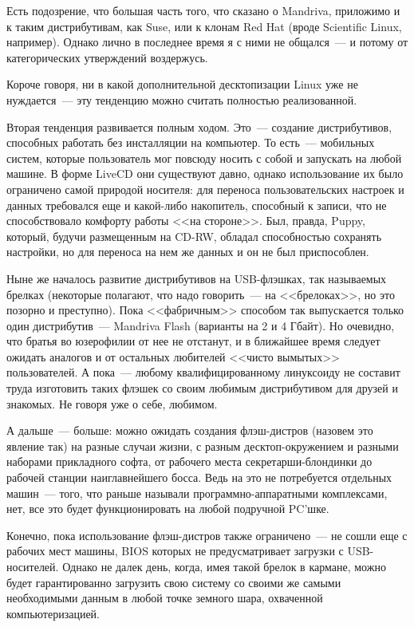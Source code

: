 Есть подозрение, что большая часть того, что сказано о Mandriva, приложимо и к таким дистрибутивам, как Suse, или к клонам Red Hat (вроде Scientific Linux, например). Однако лично в последнее время я с ними не общался~--- и потому от категорических утверждений воздержусь.

Короче говоря, ни в какой дополнительной десктопизации Linux уже не нуждается~--- эту тенденцию можно считать полностью реализованной.

Вторая тенденция развивается полным ходом. Это~--- создание дистрибутивов, способных работать без инсталляции на компьютер. То есть~--- мобильных систем, которые пользователь мог повсюду носить с собой и запускать на любой машине. В форме LiveCD они существуют давно, однако использование их было ограничено самой природой носителя: для переноса пользовательских настроек и данных требовался еще и какой-либо накопитель, способный к записи, что не способствовало комфорту работы <<на стороне>>. Был, правда, Puppy, который, будучи размещенным на CD-RW, обладал способностью сохранять настройки, но для переноса на нем же данных и он не был приспособлен.

Ныне же началось развитие дистрибутивов на USB-флэшках, так называемых брелках (некоторые полагают, что надо говорить~--- на <<брелоках>>, но это позорно и преступно). Пока <<фабричным>> способом так выпускается только один дистрибутив~--- Mandriva Flash (варианты на 2 и 4 Гбайт). Но очевидно, что братья во юзерофилии от нее не отстанут, и в ближайшее время следует ожидать аналогов и от остальных любителей <<чисто вымытых>> пользователей. А пока~--- любому квалифицированному линуксоиду не составит труда изготовить таких флэшек со своим любимым дистрибутивом для друзей и знакомых. Не говоря уже о себе, любимом.

А дальше~--- больше: можно ожидать создания флэш-дистров (назовем это явление так) на разные случаи жизни, с разным десктоп-окружением и разными наборами прикладного софта, от рабочего места секретарши-блондинки до рабочей станции наиглавнейшего босса. Ведь на это не потребуется отдельных машин~--- того, что раньше называли программно-аппаратными комплексами, нет, все это будет функционировать на любой подручной PC'шке.

Конечно, пока использование флэш-дистров также ограничено~--- не сошли еще с рабочих мест машины, BIOS которых не предусматривает загрузки с USB-носителей. Однако не далек день, когда, имея такой брелок в кармане, можно будет гарантированно загрузить свою систему со своими же самыми необходимыми данным в любой точке земного шара, охваченной компьютеризацией.

